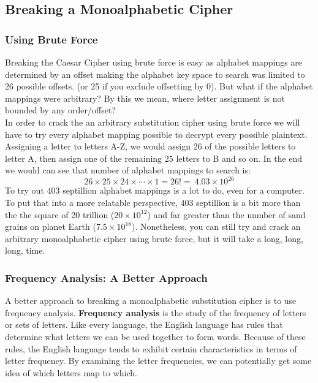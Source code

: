 \documentclass{article}
\begin{document}
\subsection{Breaking a Monoalphabetic Cipher}

\subsubsection*{Using Brute Force}
Breaking the Caesar Cipher using brute force is easy as alphabet mappings are determined by an offset making the alphabet key space to search was limited to 26 possible offsets. (or 25 if you exclude offsetting by 0). But what if the alphabet mappings were arbitrary? By this we mean, where letter assignment is not bounded by any order/offset?\\

\noindent In order to crack the an arbitrary substitution cipher using brute force we will have to try every alphabet mapping possible to decrypt every possible plaintext. Assigning a letter to letters A-Z, we would assign 26 of the possible letters to letter A, then assign one of the remaining 25 letters to B and so on. In the end we would can see that number of alphabet mappings to search is:
$$26 \times 25 \times 24 \times \cdots \times 1 = 26! = ~4.03 \times 10^{26}$$
To try out 403 septillion alphabet mappings is a lot to do, even for a computer. To put that into a more relatable perspective, 403 septillion is a bit more than the the square of 20 trillion ($20 \times 10^{12}$) and far greater than the number of sand grains on planet Earth ($7.5 \times 10^{18}$). Nonetheless, you can still try and crack an arbitrary monoalphabetic cipher using brute force, but it will take a long, long, long, time.

\subsubsection*{Frequency Analysis: A Better Approach }
A better approach to breaking a monoalphabetic substitution cipher is to use frequency analysis. \textbf{Frequency analysis} is the study of the frequency of letters or sets of letters. Like every language, the English language has rules that determine what letters we can be used together to form words. Because of these rules, the English language tends to exhibit certain characteristics in terms of letter frequency. By examining the letter frequencies, we can potentially get some idea of which letters map to which.
\end{document}
